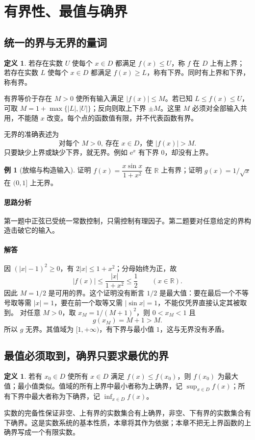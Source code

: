 \documentclass[UTF8,fontset=fandol,12pt,oneside,openany]{ctexrep}
\newcommand{\R}{\mathbb R}
\newcommand{\ee}{\mathrm e}
\theoremstyle{definition}
\newtheorem{definition}[theorem]{定义}
\newtheorem{example}{例}[chapter]
\begin{document}
\section{有界性、最值与确界}
\label{lec:01:bounds}
\subsection{统一的界与无界的量词}
\begin{definition}
若存在实数 $U$ 使每个 $x\in D$ 都满足 $f(x)\le U$，称 $f$ 在 $D$ 上有上界；若存在实数 $L$ 使每个 $x\in D$ 都满足 $f(x)\ge L$，称有下界。同时有上界和下界，称有界。
\end{definition}
有界等价于存在 $M>0$ 使所有输入满足 $|f(x)|\le M$。若已知 $L\le f(x)\le U$，可取 $M=1+\max\{|L|,|U|\}$；反向则取上下界 $\pm M$。这里 $M$ 必须对全部输入共用，不能随 $x$ 改变。每个点的函数值有限，并不代表函数有界。

无界的准确表述为
\[
 \text{对每个 }M>0,\ \text{存在 }x\in D\text{，使 }|f(x)|>M.
\]
只要缺少上界或缺少下界，就无界。例如 $\ee^x$ 有下界 $0$，却没有上界。

\begin{example}[放缩与构造输入]
证明 $f(x)=\dfrac{x\sin x}{1+x^2}$ 在 $\R$ 上有界；证明 $g(x)=1/\sqrt{x}$ 在 $(0,1]$ 上无界。
\end{example}
\paragraph{思路分析} 第一题中正弦已受统一常数控制，只需控制有理因子。第二题要对任意给定的界构造击破它的输入。
\paragraph{解答} 因 $(|x|-1)^2\ge0$，有 $2|x|\le1+x^2$；分母始终为正，故
\[
 |f(x)|\le\frac{|x|}{1+x^2}\le\frac12\qquad(x\in\R).
\]
因此 $M=1/2$ 是可用的界。这个证明没有断言 $1/2$ 是最大值：要在最后一个不等号取等需 $|x|=1$，要在前一个取等又需 $|\sin x|=1$，不能仅凭界直接认定其被取到。
对任意 $M>0$，取 $x_M=1/(M+1)^2$，则 $0<x_M<1$ 且
\[
 g(x_M)=M+1>M.
\]
所以 $g$ 无界。其值域为 $[1,+\infty)$，有下界与最小值 $1$，这与无界没有矛盾。

\subsection{最值必须取到，确界只要求最优的界}
\begin{definition}
若有 $x_0\in D$ 使所有 $x\in D$ 满足 $f(x)\le f(x_0)$，则 $f(x_0)$ 为最大值；最小值类似。值域的所有上界中最小者称为上确界，记 $\sup_{x\in D}f(x)$；所有下界中最大者称为下确界，记 $\inf_{x\in D}f(x)$。
\end{definition}
实数的完备性保证非空、上有界的实数集合有上确界，非空、下有界的实数集合有下确界。这是实数系统的基本性质，本章将其作为依据；本章不把无上界函数的上确界写成一个有限实数。
\end{document}
